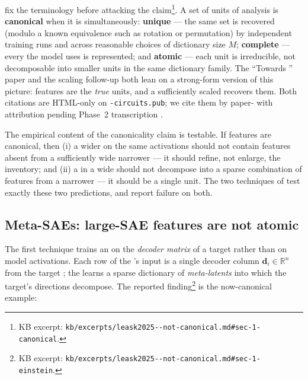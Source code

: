 \citet[\S 1]{leask2025-sae-not-canonical} fix the terminology before
attacking the claim\footnote{KB excerpt:
\texttt{kb/excerpts/leask2025--not-canonical.md\#sec-1-canonical}.}.
A set of units of analysis is \textbf{canonical} when it is
simultaneously: \textbf{unique} --- the same set is recovered (modulo
a known equivalence such as rotation or permutation) by independent
training runs and across reasonable choices of dictionary size $M$;
\textbf{complete} --- every  the model uses is represented;
and \textbf{atomic} --- each unit is irreducible, not decomposable into
smaller units in the same dictionary family. The
\citet{bricken2023-monosemanticity} ``Towards '' paper
and the \citet{templeton2024-scaling-monosemanticity} scaling
follow-up both lean on a strong-form version of this picture: 
features are the \emph{true} units, and a sufficiently scaled 
recovers them. Both citations are HTML-only on
\texttt{-circuits.pub}; we cite them by paper- with
attribution pending Phase~2 transcription
.

The empirical content of the canonicality claim is testable. If
features are canonical, then (i) a wider  on the same activations
should not contain features absent from a sufficiently wide narrower
 --- it should refine, not enlarge, the inventory; and (ii) a
 in a wide  should not decompose into a sparse combination
of features from a narrower  --- it should be a single unit. The
two techniques of \citet{leask2025-sae-not-canonical} test exactly
these two predictions, and report failure on both.

\subsection{Meta-SAEs: large-SAE features are not atomic}
\label{sec:meta-saes}

The first technique trains an  on the \emph{decoder matrix} of a
target  rather than on model activations. Each row of the
's input is a single decoder column $\mathbf{d}_i \in
\mathbb{R}^n$ from the target ; the  learns a sparse
dictionary of \emph{meta-latents} into which the target's 
directions decompose. The reported finding\footnote{KB excerpt:
\texttt{kb/excerpts/leask2025--not-canonical.md\#sec-1-einstein}.}
is the now-canonical example:

